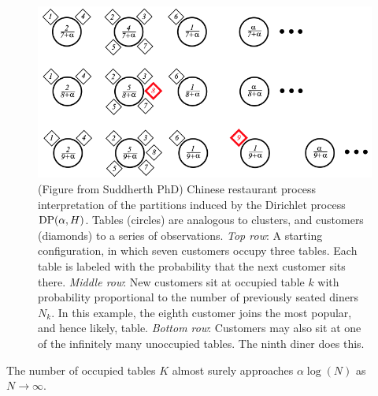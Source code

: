 \begin{figure}[htp!]
	\centering
	\includegraphics[width=1\textwidth]{np/dp/crp}
	\caption{(Figure from Suddherth PhD) Chinese restaurant process interpretation of the partitions induced by the Dirichlet process $\operatorname{DP}(\alpha, H)$. Tables (circles) are analogous to clusters, and customers (diamonds) to a series of observations. \emph{Top row}: A starting configuration, in which seven customers occupy three tables. Each table is labeled with the probability that the next customer sits there. \emph{Middle row}: New customers sit at occupied table $k$ with probability proportional to the number of previously seated diners $N_k$. In this example, the eighth customer joins the most popular, and hence likely, table. \emph{Bottom row}: Customers may also sit at one of the infinitely many unoccupied tables. The ninth diner does this.}
\end{figure}

The number of occupied tables $K$ almost surely approaches $\alpha \log(N)$ as $N \to \infty$.